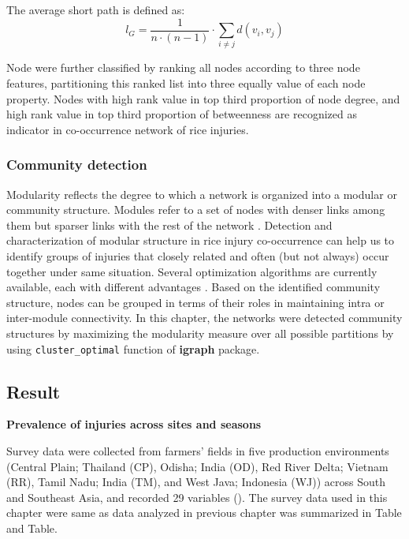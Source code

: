The average short path is defined as:
\begin{equation}
l_G = \frac{1}{n \cdot (n - 1)} \cdot \sum_{i \ne j} d(v_i, v_j)
\end{equation}

Node were further classified by ranking all nodes according to three node features, partitioning this ranked list into three equally value of each node property. Nodes with high rank value in top third proportion of node degree, and high rank value in top third proportion of betweenness are recognized as indicator in co-occurrence network of rice injuries. 

\subsubsection{Community detection}

Modularity reflects the degree to which a network is organized into a modular or community structure. Modules refer to a set of nodes with denser links among them but sparser links with the rest of the network \citep{Newman_2006_Modularity}. Detection and characterization of modular structure in rice injury co-occurrence can help us to identify groups of injuries that closely related and often (but not always) occur together under same situation. Several optimization algorithms are currently available, each with different advantages \citep{Brandes_2008_Modularity}. Based on the identified community structure, nodes can be grouped in terms of their roles in maintaining intra or inter-module connectivity. In this chapter, the networks were detected community structures by maximizing the modularity measure over all possible partitions by using \texttt{cluster\_optimal} function of \textbf{igraph} package.

\subsection{Result}

\textbf{Prevalence of injuries across sites and seasons}


Survey data were collected from farmers’ fields in five production environments (Central Plain; Thailand (CP), Odisha; India (OD), Red River Delta; Vietnam (RR), Tamil Nadu; India (TM), and West Java; Indonesia (WJ)) across South and Southeast Asia, and recorded 29 variables ().  The survey data used in this chapter were same as data analyzed in previous chapter was summarized in Table and Table.

